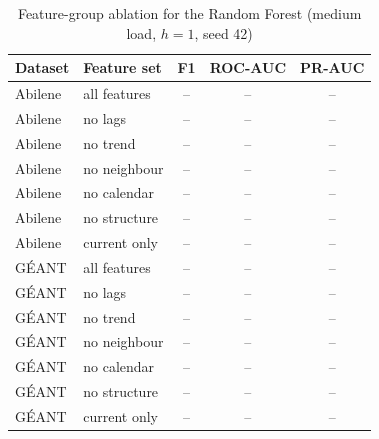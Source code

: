 \begin{table}[t]
\centering
\caption{Feature-group ablation for the Random Forest (medium load, $h=1$, seed 42)}
\label{tab:abl_feat}
\scriptsize
\begin{tabular}{@{}llccc@{}}
\toprule
Dataset & Feature set & F1 & ROC-AUC & PR-AUC \\
\midrule
Abilene & all features & -- & -- & -- \\
Abilene & no lags & -- & -- & -- \\
Abilene & no trend & -- & -- & -- \\
Abilene & no neighbour & -- & -- & -- \\
Abilene & no calendar & -- & -- & -- \\
Abilene & no structure & -- & -- & -- \\
Abilene & current only & -- & -- & -- \\
G\'EANT & all features & -- & -- & -- \\
G\'EANT & no lags & -- & -- & -- \\
G\'EANT & no trend & -- & -- & -- \\
G\'EANT & no neighbour & -- & -- & -- \\
G\'EANT & no calendar & -- & -- & -- \\
G\'EANT & no structure & -- & -- & -- \\
G\'EANT & current only & -- & -- & -- \\
\bottomrule
\end{tabular}
\end{table}
